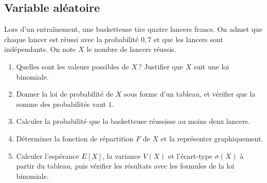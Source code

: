 \subsection*{Variable al\'eatoire}
\begin{exo}\label{exo:proba-19}
Lors d'un entra\^inement, une basketteuse tire quatre lancers francs.
On admet que chaque lancer est r\'eussi avec la probabilit\'e $0,7$ et que les lancers sont ind\'ependants.
On note $X$ le nombre de lancers r\'eussis.
\begin{enumerate}
\item Quelles sont les valeurs possibles de $X$\,? Justifier que $X$ suit une loi binomiale.
\item Donner la loi de probabilit\'e de $X$ sous forme d'un tableau, et v\'erifier que la somme des probabilit\'es vaut $1$.
\item Calculer la probabilit\'e que la basketteuse r\'eussisse au moins deux lancers.
\item D\'eterminer la fonction de r\'epartition $F$ de $X$ et la repr\'esenter graphiquement.
\item Calculer l'esp\'erance $E[X]$, la variance $V(X)$ et l'\'ecart-type $\sigma(X)$ \`a partir du tableau,
      puis v\'erifier les r\'esultats avec les formules de la loi binomiale.
\end{enumerate}
\end{exo}
%
